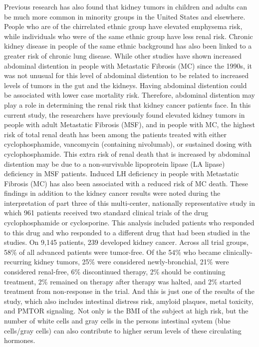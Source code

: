 \documentclass{article}%
\begin{document}
Previous research has also found that kidney tumors in children and adults can be much more common in minority groups in the United States and elsewhere. People who are of the chirrelated ethnic group have elevated emphysema risk, while individuals who were of the same ethnic group have less renal risk. Chronic kidney disease in people of the same ethnic background has also been linked to a greater risk of chronic lung disease. While other studies have shown increased abdominal distention in people with Metastatic Fibrosis (MC) since the 1990s, it was not unusual for this level of abdominal distention to be related to increased levels of tumors in the gut and the kidneys. Having abdominal distention could be associated with lower case mortality risk. Therefore, abdominal distention may play a role in determining the renal risk that kidney cancer patients face. In this current study, the researchers have previously found elevated kidney tumors in people with adult Metastatic Fibrosis (MSF), and in people with MC, the highest risk of total renal death has been among the patients treated with either cyclophosphamide, vancomycin (containing nivolumab), or sustained dosing with cyclophosphamide. This extra risk of renal death that is increased by abdominal distention may be due to a non{-}survivable lipoprotein lipase (LA lipase) deficiency in MSF patients. Induced LH deficiency in people with Metastatic Fibrosis (MC) has also been associated with a reduced risk of MC death. These findings in addition to the kidney cancer results were noted during the interpretation of part three of this multi{-}center, nationally representative study in which 961 patients received two standard clinical trials of the drug cyclophosphamide or cyclosporine. This analysis included patients who responded to this drug and who responded to a different drug that had been studied in the studies. On 9,145 patients, 239 developed kidney cancer. Across all trial groups, 58\% of all advanced patients were tumor{-}free. Of the 54\% who became clinically{-}recurring kidney tumors, 25\% were considered newly{-}bronchial, 21\% were considered renal{-}free, 6\% discontinued therapy, 2\% should be continuing treatment, 2\% remained on therapy after therapy was halted, and 2\% started treatment from non{-}response in the trial.\newline%
And this is just one of the results of the study, which also includes intestinal distress risk, amyloid plaques, metal toxicity, and PMTOR signaling. Not only is the BMI of the subject at high risk, but the number of white cells and gray cells in the persons intestinal system (blue cells/gray cells) can also contribute to higher serum levels of these circulating hormones.
\end{document}
